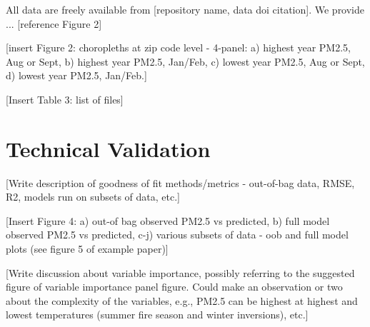 \documentclass[english]{article}
\begin{document}


All data are freely available from [repository name, data doi citation]. We provide ... [reference Figure 2]

[insert Figure 2: choropleths at zip code level - 4-panel: a) highest year PM2.5, Aug or Sept, b) highest year PM2.5, Jan/Feb, c) lowest year PM2.5, Aug or Sept, d) lowest year PM2.5, Jan/Feb.]

[Insert Table 3: list of files]

\section*{Technical Validation}


[Write description of goodness of fit methods/metrics - out-of-bag data, RMSE, R2, models run on subsets of data, etc.]

[Insert Figure 4: a) out-of bag observed PM2.5 vs predicted, b) full model observed PM2.5 vs predicted, c-j) various subsets of data - oob and full model plots (see figure 5 of example paper)]

[Write discussion about variable importance, possibly referring to the suggested figure of variable importance panel figure. Could make an observation or two about the complexity of the variables, e.g., PM2.5 can be highest at highest and lowest temperatures (summer fire season and winter inversions), etc.]
\end{document}
